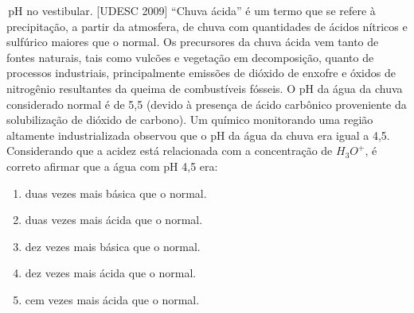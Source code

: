 \begin{task}{\,pH no vestibular.}
[UDESC 2009] “Chuva ácida” é um termo que se refere à precipitação, a partir da
atmosfera, de chuva com quantidades de ácidos nítricos e sulfúrico maiores que o
normal. Os precursores da chuva ácida vem tanto de fontes naturais, tais como vulcões
e vegetação em decomposição, quanto de processos industriais, principalmente
emissões de dióxido de enxofre e óxidos de nitrogênio resultantes da queima de
combustíveis fósseis. O pH da água da chuva considerado normal é de 5,5 (devido
à presença de ácido carbônico proveniente da solubilização de dióxido de carbono).
Um químico monitorando uma região altamente industrializada observou que o pH da
água da chuva era igual a 4,5. Considerando que a acidez está relacionada com a
concentração de $H_3O^+$, é correto afirmar que a água com pH 4,5 era:
\begin{enumerate}[itemsep=0pt]
\item duas vezes mais básica que o normal.
\item duas vezes mais ácida que o normal.
\item dez vezes mais básica que o normal.
\item dez vezes mais ácida que o normal.
\item cem vezes mais ácida que o normal.
\end{enumerate}
\end{task}











